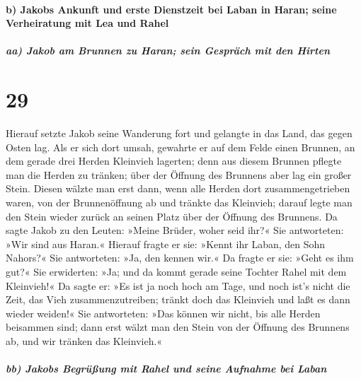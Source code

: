 \hypertarget{b-jakobs-ankunft-und-erste-dienstzeit-bei-laban-in-haran-seine-verheiratung-mit-lea-und-rahel}{%
\paragraph{b) Jakobs Ankunft und erste Dienstzeit bei Laban in Haran;
seine Verheiratung mit Lea und
Rahel}\label{b-jakobs-ankunft-und-erste-dienstzeit-bei-laban-in-haran-seine-verheiratung-mit-lea-und-rahel}}

\hypertarget{aa-jakob-am-brunnen-zu-haran-sein-gespruxe4ch-mit-den-hirten}{%
\subparagraph{aa) Jakob am Brunnen zu Haran; sein Gespräch mit den
Hirten}\label{aa-jakob-am-brunnen-zu-haran-sein-gespruxe4ch-mit-den-hirten}}

\hypertarget{section-28}{%
\section{29}\label{section-28}}

 Hierauf setzte Jakob seine Wanderung fort und gelangte in
das Land, das gegen Osten lag.  Als er sich dort umsah,
gewahrte er auf dem Felde einen Brunnen, an dem gerade drei Herden
Kleinvieh lagerten; denn aus diesem Brunnen pflegte man die Herden zu
tränken; über der Öffnung des Brunnens aber lag ein großer Stein.
 Diesen wälzte man erst dann, wenn alle Herden dort
zusammengetrieben waren, von der Brunnenöffnung ab und tränkte das
Kleinvieh; darauf legte man den Stein wieder zurück an seinen Platz über
der Öffnung des Brunnens.  Da sagte Jakob zu den Leuten:
»Meine Brüder, woher seid ihr?« Sie antworteten: »Wir sind aus Haran.«
 Hierauf fragte er sie: »Kennt ihr Laban, den Sohn
Nahors?« Sie antworteten: »Ja, den kennen wir.«  Da fragte
er sie: »Geht es ihm gut?« Sie erwiderten: »Ja; und da kommt gerade
seine Tochter Rahel mit dem Kleinvieh!«  Da sagte er: »Es
ist ja noch hoch am Tage, und noch ist's nicht die Zeit, das Vieh
zusammenzutreiben; tränkt doch das Kleinvieh und laßt es dann wieder
weiden!«  Sie antworteten: »Das können wir nicht, bis alle
Herden beisammen sind; dann erst wälzt man den Stein von der Öffnung des
Brunnens ab, und wir tränken das Kleinvieh.«

\hypertarget{bb-jakobs-begruxfcuxdfung-mit-rahel-und-seine-aufnahme-bei-laban}{%
\subparagraph{bb) Jakobs Begrüßung mit Rahel und seine Aufnahme bei
Laban}\label{bb-jakobs-begruxfcuxdfung-mit-rahel-und-seine-aufnahme-bei-laban}}

